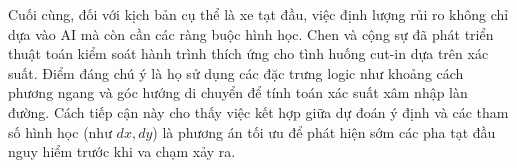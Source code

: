 	Cuối cùng, đối với kịch bản cụ thể là xe tạt đầu, việc định lượng rủi ro không chỉ dựa vào AI mà còn cần các ràng buộc hình học. Chen và cộng sự \cite{Chen2021AdaptiveCC} đã phát triển thuật toán kiểm soát hành trình thích ứng cho tình huống cut-in dựa trên xác suất. Điểm đáng chú ý là họ sử dụng các đặc trưng logic như khoảng cách phương ngang và góc hướng di chuyển để tính toán xác suất xâm nhập làn đường. Cách tiếp cận này cho thấy việc kết hợp giữa dự đoán ý định và các tham số hình học (như $dx, dy$) là phương án tối ưu để phát hiện sớm các pha tạt đầu nguy hiểm trước khi va chạm xảy ra.